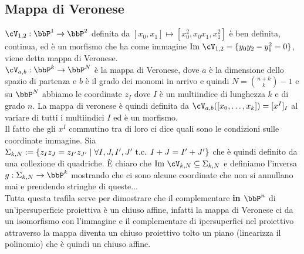 \documentclass[a4paper,NoNotes,GeneralMath]{stdmdoc}
\begin{document}
	\subsection*{Mappa di Veronese}
	$\cV_{1,2}: \bbP^1 \rar \bbP^2$ definita da $[x_0, x_1] \mapsto [x_0^2, x_0x_1, x_1^2]$ è ben definita, continua, ed è un morfismo che ha come immagine $\Img \cV_{1,2} = \{y_0y_2 - y_1^2 = 0\}$, viene detta mappa di Veronese. \\
	$\cV_{a,b}: \bbP^k \rar \bbP^N$ è la mappa di Veronese, dove $a$ è la dimensione dello spazio di partenza e $b$ è il grado dei monomi in arrivo e quindi $N = \binom{n+k}{k} - 1$ e su $\bbP^N$ abbiamo le coordinate $z_I$ dove $I$ è un multiindice di lunghezza $k$ e di grado $n$. La mappa di veronese è quindi definita da $\cV_{a,b} ([x_0, \ldots, x_k]) = [x^I]_I$ al variare di tutti i multiindici $I$ ed è un morfismo. \\
	Il fatto che gli $x^I$ commutino tra di loro ci dice quali sono le condizioni sulle coordinate immagine. Sia $\Sigma_{k,N} := \{ z_I z_J = z_{I'} z_{J'} \mid \forall I, J, I', J' \mbox{ t.c. } I+J = I'+J' \}$ che è quindi definito da una collezione di quadriche. È chiaro che $\Img \cV_{k,N} \subseteq \Sigma_{k,N}$ e definiamo l'inversa $g: \Sigma_{k,N} \rar \bbP^k$ mostrando che ci sono alcune coordinate che non si annullano mai e prendendo stringhe di queste... \\
	Tutta questa trafila serve per dimostrare che il complementare {\bf in $\bbP^n$} di un'ipersuperficie proiettiva è un chiuso affine, infatti la mappa di Veronese ci da un isomorfismo con l'immagine e il complementare di ipersuperfici nel proiettivo attraverso la mappa diventa un chiuso proiettivo tolto un piano (linearizza il polinomio) che è quindi un chiuso affine.
	
\end{document}
